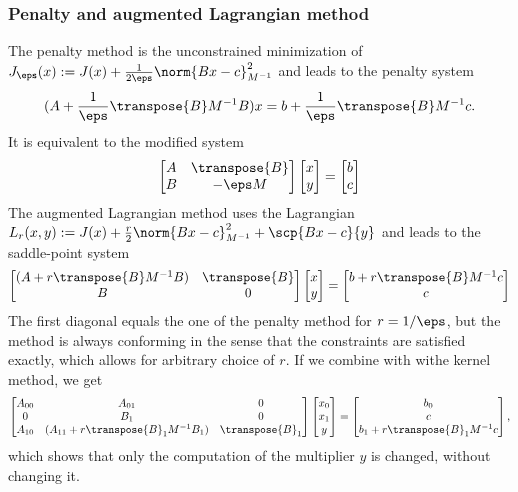 \subsubsection{Penalty and augmented Lagrangian method}
%
The penalty method is the unconstrained minimization of $J_{\eps}(x):= J(x) + \frac{1}{2\eps}\norm{Bx-c}^2_{M^{-1}}$
and leads to the penalty system
%
\begin{equation}\label{eq:SaddlePointPenalty}
(A + \frac{1}{\eps} \transpose{B}M^{-1}B) x = b + \frac{1}{\eps} \transpose{B}M^{-1}c.
\end{equation}
%
It is equivalent to the modified system
%
\begin{align*}
\begin{bmatrix}
A & \transpose{B}\\
B & -\eps M
\end{bmatrix}
\begin{bmatrix}
x\\y
\end{bmatrix}
=
\begin{bmatrix}
b\\c
\end{bmatrix}
\end{align*}
%
The augmented Lagrangian method uses the Lagrangian $L_r(x,y):= J(x) + \frac{r}{2}\norm{Bx-c}^2_{M^{-1}} + \scp{Bx-c}{y}$ and leads to the saddle-point system
%
\begin{align*}
\begin{bmatrix}
(A + r\transpose{B}M^{-1}B) & \transpose{B}\\
B & 0
\end{bmatrix}
\begin{bmatrix}
x\\y
\end{bmatrix}
=
\begin{bmatrix}
b+r\transpose{B}M^{-1}c\\c
\end{bmatrix}
\end{align*}
%
The first diagonal equals the one of the penalty method for $r=1/\eps$, but the method is always conforming in the sense that the constraints are satisfied exactly, which allows for arbitrary choice of $r$.
%
If we combine with withe kernel method, we get
%
\begin{align*}
\begin{bmatrix}
A_{00} & A_{01} & 0\\
0 & B_1 & 0\\
A_{10} & (A_{11}+r\transpose{B}_1M^{-1}B_1) & \transpose{B}_1\\
\end{bmatrix}
\begin{bmatrix}
x_0\\x_1\\y
\end{bmatrix}
=
\begin{bmatrix}
b_0\\c\\b_1+r\transpose{B}_1M^{-1}c
\end{bmatrix},
\end{align*}
%
which shows that only the computation of the multiplier $y$ is changed, without changing it. 

